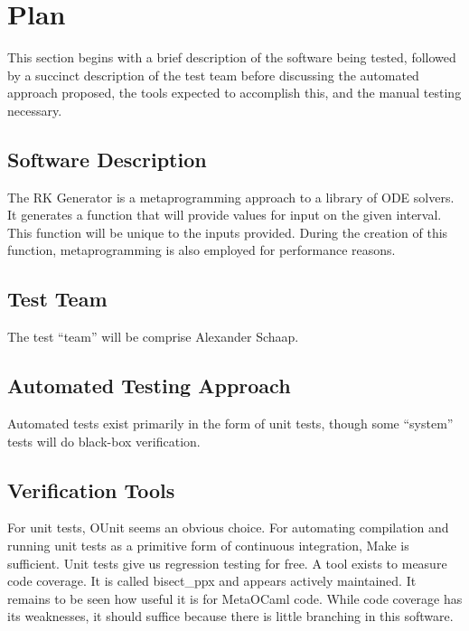 \documentclass[12pt, titlepage]{article}
\begin{document}
\section{Plan}
This section begins with a brief description of the software being tested, 
followed by a succinct description of the test team before discussing the 
automated approach proposed, the tools expected to accomplish this, and the 
manual testing necessary.

\subsection{Software Description}

The RK Generator is a metaprogramming approach to a library of ODE solvers.
It generates a function that will provide values for input on the given 
interval. This function will be unique to the inputs provided. During the 
creation of this function, metaprogramming is also employed for performance 
reasons.

\subsection{Test Team}

The test ``team'' will be comprise Alexander Schaap.
\subsection{Automated Testing Approach}

Automated tests exist primarily in the form of unit tests, though some 
``system'' tests will do black-box verification.

\subsection{Verification Tools}

For unit tests, OUnit seems an obvious choice. For automating compilation and 
running unit tests as a primitive form of continuous integration, Make is 
sufficient. Unit tests give us regression testing for free. A tool exists to 
measure code coverage. It is called bisect\_ppx and appears actively 
maintained. It remains to be seen how useful it is for MetaOCaml code. While 
code coverage has its weaknesses, it should suffice because there is little 
branching in this software.
\end{document}
